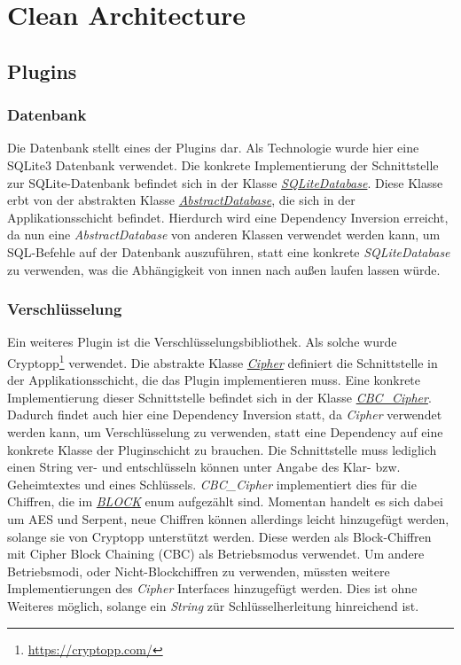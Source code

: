 \chapter{Clean Architecture}
\section{Plugins}
\subsection{Datenbank}
Die Datenbank stellt eines der Plugins dar. Als Technologie wurde hier eine SQLite3 Datenbank verwendet. Die konkrete Implementierung der Schnittstelle zur SQLite-Datenbank befindet sich in der Klasse \href{https://github.com/moorts/Morik/blob/main/src/plugins/database/SQLiteDatabase.h}{\textit{SQLiteDatabase}}. Diese Klasse erbt von der abstrakten Klasse \href{https://github.com/moorts/Morik/blob/main/src/application/AbstractDatabase.h}{\textit{AbstractDatabase}}, die sich in der Applikationsschicht befindet. Hierdurch wird eine Dependency Inversion erreicht, da nun eine \textit{AbstractDatabase} von anderen Klassen verwendet werden kann, um SQL-Befehle auf der Datenbank auszuführen, statt eine konkrete \textit{SQLiteDatabase} zu verwenden, was die Abhängigkeit von innen nach außen laufen lassen würde.

\subsection{Verschlüsselung}

Ein weiteres Plugin ist die Verschlüsselungsbibliothek. Als solche wurde Cryptopp\footnote{\url{https://cryptopp.com/}} verwendet. Die abstrakte Klasse \href{https://github.com/moorts/Morik/blob/main/src/application/Cipher.h}{\textit{Cipher}} definiert die Schnittstelle in der Applikationsschicht, die das Plugin implementieren muss. Eine konkrete Implementierung dieser Schnittstelle befindet sich in der Klasse \href{https://github.com/moorts/Morik/blob/main/src/plugins/encryption/CBC\_Cipher.h}{\textit{CBC\_Cipher}}. Dadurch findet auch hier eine Dependency Inversion statt, da \textit{Cipher} verwendet werden kann, um Verschlüsselung zu verwenden, statt eine Dependency auf eine konkrete Klasse der Pluginschicht zu brauchen. Die Schnittstelle muss lediglich einen String ver- und entschlüsseln können unter Angabe des Klar- bzw. Geheimtextes und eines Schlüssels. \textit{CBC\_Cipher} implementiert dies für die Chiffren, die im \href{https://github.com/moorts/Morik/blob/main/src/plugins/encryption/BLOCK.h}{\textit{BLOCK}} enum aufgezählt sind. Momentan handelt es sich dabei um AES und Serpent, neue Chiffren können allerdings leicht hinzugefügt werden, solange sie von Cryptopp unterstützt werden. Diese werden als Block-Chiffren mit Cipher Block Chaining (CBC) als Betriebsmodus verwendet. Um andere Betriebsmodi, oder Nicht-Blockchiffren zu verwenden, müssten weitere Implementierungen des \textit{Cipher} Interfaces hinzugefügt werden. Dies ist ohne Weiteres möglich, solange ein \textit{String} zür Schlüsselherleitung hinreichend ist.

